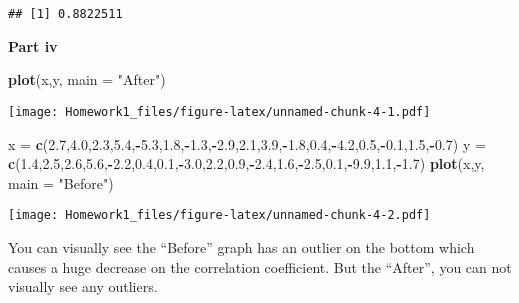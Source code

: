\documentclass[
]{article}
\newenvironment{Shaded}{\begin{snugshade}}{\end{snugshade}}
\newcommand{\AttributeTok}[1]{\textcolor[rgb]{0.13,0.29,0.53}{#1}}
\newcommand{\FloatTok}[1]{\textcolor[rgb]{0.00,0.00,0.81}{#1}}
\newcommand{\FunctionTok}[1]{\textcolor[rgb]{0.13,0.29,0.53}{\textbf{#1}}}
\newcommand{\NormalTok}[1]{#1}
\newcommand{\OtherTok}[1]{\textcolor[rgb]{0.56,0.35,0.01}{#1}}
\newcommand{\SpecialCharTok}[1]{\textcolor[rgb]{0.81,0.36,0.00}{\textbf{#1}}}
\newcommand{\StringTok}[1]{\textcolor[rgb]{0.31,0.60,0.02}{#1}}
\begin{document}
\begin{verbatim}
## [1] 0.8822511
\end{verbatim}

\textbf{Part iv}

\begin{Shaded}
\begin{Highlighting}[]
\FunctionTok{plot}\NormalTok{(x,y, }\AttributeTok{main =} \StringTok{"After"}\NormalTok{)}
\end{Highlighting}
\end{Shaded}

\texttt{[image: Homework1\_files/figure-latex/unnamed-chunk-4-1.pdf]}

\begin{Shaded}
\begin{Highlighting}[]
\NormalTok{x }\OtherTok{=} \FunctionTok{c}\NormalTok{(}\FloatTok{2.7}\NormalTok{,}\FloatTok{4.0}\NormalTok{,}\FloatTok{2.3}\NormalTok{,}\FloatTok{5.4}\NormalTok{,}\SpecialCharTok{{-}}\FloatTok{5.3}\NormalTok{,}\FloatTok{1.8}\NormalTok{,}\SpecialCharTok{{-}}\FloatTok{1.3}\NormalTok{,}\SpecialCharTok{{-}}\FloatTok{2.9}\NormalTok{,}\FloatTok{2.1}\NormalTok{,}\FloatTok{3.9}\NormalTok{,}\SpecialCharTok{{-}}\FloatTok{1.8}\NormalTok{,}\FloatTok{0.4}\NormalTok{,}\SpecialCharTok{{-}}\FloatTok{4.2}\NormalTok{,}\FloatTok{0.5}\NormalTok{,}\SpecialCharTok{{-}}\FloatTok{0.1}\NormalTok{,}\FloatTok{1.5}\NormalTok{,}\SpecialCharTok{{-}}\FloatTok{0.7}\NormalTok{)}
\NormalTok{y }\OtherTok{=} \FunctionTok{c}\NormalTok{(}\FloatTok{1.4}\NormalTok{,}\FloatTok{2.5}\NormalTok{,}\FloatTok{2.6}\NormalTok{,}\FloatTok{5.6}\NormalTok{,}\SpecialCharTok{{-}}\FloatTok{2.2}\NormalTok{,}\FloatTok{0.4}\NormalTok{,}\FloatTok{0.1}\NormalTok{,}\SpecialCharTok{{-}}\FloatTok{3.0}\NormalTok{,}\FloatTok{2.2}\NormalTok{,}\FloatTok{0.9}\NormalTok{,}\SpecialCharTok{{-}}\FloatTok{2.4}\NormalTok{,}\FloatTok{1.6}\NormalTok{,}\SpecialCharTok{{-}}\FloatTok{2.5}\NormalTok{,}\FloatTok{0.1}\NormalTok{,}\SpecialCharTok{{-}}\FloatTok{9.9}\NormalTok{,}\FloatTok{1.1}\NormalTok{,}\SpecialCharTok{{-}}\FloatTok{1.7}\NormalTok{)}
\FunctionTok{plot}\NormalTok{(x,y, }\AttributeTok{main =} \StringTok{"Before"}\NormalTok{)}
\end{Highlighting}
\end{Shaded}

\texttt{[image: Homework1\_files/figure-latex/unnamed-chunk-4-2.pdf]}

You can visually see the ``Before'' graph has an outlier on the bottom
which causes a huge decrease on the correlation coefficient. But the
``After'', you can not visually see any outliers.
\end{document}
